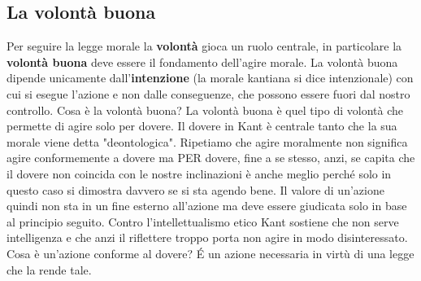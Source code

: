 \documentclass[10pt,a4paper]{article}
\begin{document}
\subsection{La volontà buona}
Per seguire la legge morale la \textbf{volontà} gioca un ruolo centrale, in particolare la \textbf{volontà buona} deve essere il fondamento dell'agire morale. La volontà buona dipende unicamente dall'\textbf{intenzione} (la morale kantiana si dice intenzionale) con cui si esegue l'azione e non dalle conseguenze, che possono essere fuori dal nostro controllo.
Cosa è la volontà buona? La volontà buona è quel tipo di volontà che permette di agire solo per dovere. Il dovere in Kant è centrale tanto che la sua morale viene detta "deontologica". Ripetiamo che agire moralmente non significa agire conformemente a dovere ma PER dovere, fine a se stesso, anzi, se capita che il dovere non coincida con le nostre inclinazioni è anche meglio perché solo in questo caso si dimostra davvero se si sta agendo bene. Il valore di un'azione quindi non sta in un fine esterno all'azione ma deve essere giudicata solo in base al principio seguito. Contro l'intellettualismo etico Kant sostiene che non serve intelligenza e che anzi il riflettere troppo porta non agire in modo disinteressato.\\
Cosa è un'azione conforme al dovere? \'E un azione necessaria in virtù di una legge che la rende tale.\\
\end{document}
